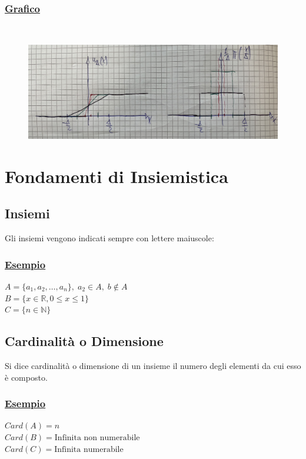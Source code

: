 \documentclass{article}
\begin{document}
\subsubsection{\underline{Grafico}} ~\\
\begin{figure}[ht]
\centering
\includegraphics[scale=0.10]{images/13.Dirac2.jpeg}
\end{figure} 

\section{Fondamenti di Insiemistica}

\subsection{Insiemi}
Gli insiemi vengono indicati sempre con lettere maiuscole:
\subsubsection{\underline{Esempio}}
$A=\{ a_1,a_2, \dots , a_n\}, \;  a_2 \in A, \; b \notin A$ \\
$B = \{ x \in \mathbb{R} , 0 \leq x \leq 1\}$ \\
$C = \{ n \in \mathbb{N}\}$ \\

\subsection{Cardinalità o Dimensione}
Si dice cardinalità o dimensione di un insieme il numero degli elementi da cui esso è composto.
\subsubsection{\underline{Esempio}}
$Card(A) =n$ \\
$Card(B) = \text{Infinita non numerabile}$ \\
$Card(C) = \text{Infinita numerabile}$
\end{document}
